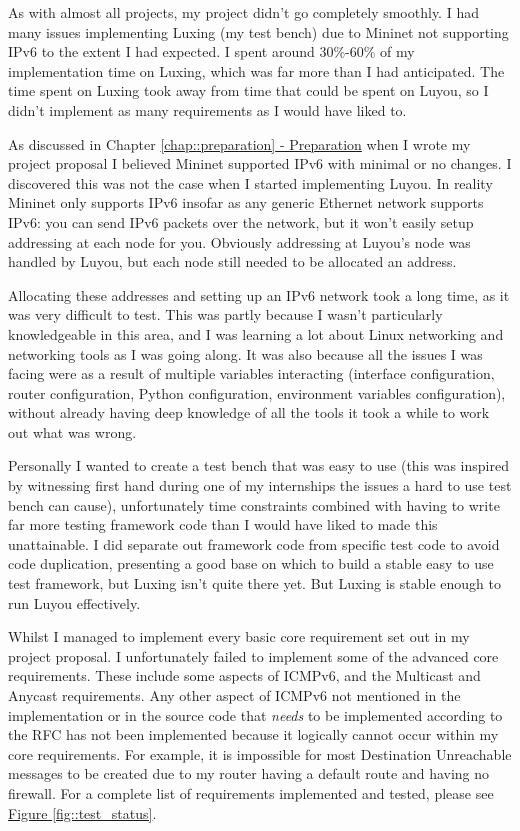 \documentclass[12pt,a4paper,twoside,openany]{report}
\begin{document}
As with almost all projects, my project didn't go completely smoothly. I had many issues implementing Luxing (my test bench) due to Mininet not supporting IPv6 to the extent I had expected. I spent around 30\%-60\% of my implementation time on Luxing, which was far more than I had anticipated. The time spent on Luxing took away from time that could be spent on Luyou, so I didn't implement as many requirements as I would have liked to.

\bigskip

As discussed in Chapter \ref{chap::preparation}\hyperref[chap::preparation]{ - Preparation} when I wrote my project proposal I believed Mininet supported IPv6 with minimal or no changes\cite{tw_mininet}.  I discovered this was not the case when I started implementing Luyou.  In reality Mininet only supports IPv6 insofar as any generic Ethernet network supports IPv6: you can send IPv6 packets over the network, but it won't easily setup addressing at each node for you.  Obviously addressing at Luyou's node was handled by Luyou, but each node still needed to be allocated an address. 

Allocating these addresses and setting up an IPv6 network took a long time, as it was very difficult to test.  This was partly because I wasn't particularly knowledgeable in this area, and I was learning a lot about Linux networking and networking tools as I was going along. It was also because all the issues I was facing were as a result of multiple variables interacting (interface configuration, router configuration, Python configuration, environment variables configuration), without already having deep knowledge of all the tools it took a while to work out what was wrong. 

Personally I wanted to create a test bench that was easy to use (this was inspired by witnessing first hand during one of my internships the issues a hard to use test bench can cause), unfortunately time constraints combined with having to write far more testing framework code than I would have liked to made this unattainable.  I did separate out framework code from specific test code to avoid code duplication, presenting a good base on which to build a stable easy to use test framework, but Luxing isn't quite there yet. But Luxing is stable enough to run Luyou effectively.

\bigskip

Whilst I managed to implement every basic core requirement set out in my project proposal. I unfortunately failed to implement some of the advanced core requirements. These include some aspects of ICMPv6, and the Multicast and Anycast requirements. Any other aspect of ICMPv6 not mentioned in the implementation or in the source code that \textit{needs} to be implemented according to the RFC has not been implemented because it logically cannot occur within my core requirements.  For example, it is impossible for most Destination Unreachable messages to be created due to my router having a default route and having no firewall.  For a complete list of requirements implemented and tested, please see \hyperref[fig::test_status]{Figure }\ref{fig::test_status}.
\end{document}
